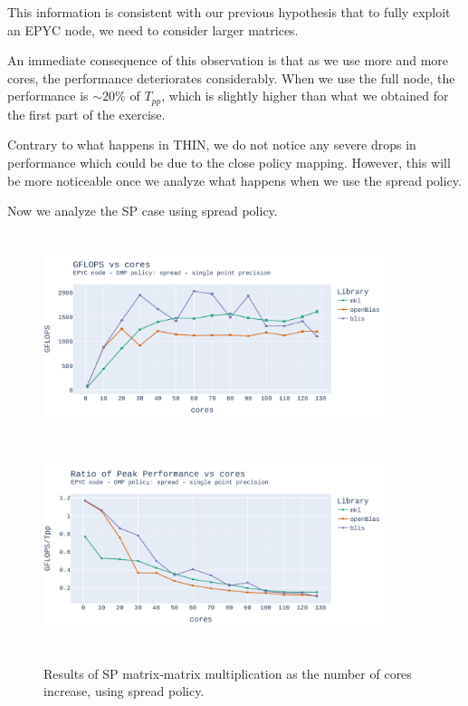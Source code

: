 \documentclass{report}
\begin{document}
This information is consistent with our previous hypothesis that to fully exploit 
an EPYC node, we need to consider larger matrices. 

An immediate consequence of this observation is that as we use more and more cores, 
the performance deteriorates considerably. When we use the full node, the 
performance is $\sim20\%$ of $T_{pp}$, which is slightly higher than what we obtained for 
the first part of the exercise.

Contrary to what happens in THIN, we do not notice any severe drops in performance 
which could be due to the close policy mapping. However, this will be more 
noticeable once we analyze what happens when we use the spread policy.

Now we analyze the SP case using spread policy.

\begin{figure}[H]
\hspace*{-2.5cm}
\includegraphics[width=10cm, height=6cm]{./images/fixed_size_epyc_float_gflops_spread.pdf}
\includegraphics[width=10cm, height=6cm]{./images/fixed_size_epyc_float_gflops_spread_ratio.pdf}
\caption{\label{fig:fixed_size_epyc_float_spread} Results of SP matrix-matrix multiplication 
as the number of cores increase, using spread policy.}
\end{figure}
\end{document}
